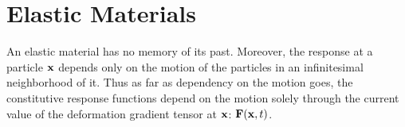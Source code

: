 %
%
%
%














\chapter{Elastic Materials}\label{elasticmat}
An elastic material has no memory of its past. Moreover, the response at a particle $\mathbf{x}$ depends only on the motion of the particles in an infinitesimal neighborhood of it. Thus as
far as dependency on the motion goes, the constitutive response functions depend on the
motion solely through the current value of the deformation gradient tensor at $\mathbf{x}$: $\mathbf{F}(\mathbf{x}, t)$.

